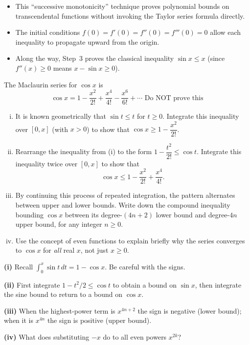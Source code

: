 \begin{takeaways}
\begin{itemize}[leftmargin=*]
  \item This ``successive monotonicity'' technique proves polynomial bounds on transcendental
        functions without invoking the Taylor series formula directly.
  \item The initial conditions $f(0)=f'(0)=f''(0)=f'''(0)=0$ allow each inequality to
        propagate upward from the origin.
  \item Along the way, Step~3 proves the classical inequality $\sin x \le x$ (since $f''(x)\ge0$
        means $x - \sin x \ge 0$).
\end{itemize}
\end{takeaways}

\begin{problem}
The Maclaurin series for $\cos x$ is
\[
\cos x = 1 - \frac{x^2}{2!} + \frac{x^4}{4!} - \frac{x^6}{6!} + \cdots \text{ Do NOT prove this}
\]

\begin{enumerate}[(i)]
  \item It is known geometrically that $\sin t \le t$ for $t \ge 0$.  Integrate this inequality
        over $[0, x]$ (with $x > 0$) to show that $\cos x \ge 1 - \dfrac{x^2}{2!}$.
  \item Rearrange the inequality from (i) to the form $1 - \dfrac{t^2}{2!} \le \cos t$.
        Integrate this inequality twice over $[0, x]$ to show that
        \[
        \cos x \le 1 - \frac{x^2}{2!} + \frac{x^4}{4!}.
        \]
  \item By continuing this process of repeated integration, the pattern alternates between upper
        and lower bounds.  Write down the compound inequality bounding $\cos x$ between its
        degree-$(4n+2)$ lower bound and degree-$4n$ upper bound, for any integer $n \ge 0$.
  \item Use the concept of even functions to explain briefly why the series converges to
        $\cos x$ for \emph{all} real $x$, not just $x \ge 0$.
\end{enumerate}
\end{problem}

\begin{hintbox}
\textbf{(i)} Recall $\int_0^x \sin t\,dt = 1 - \cos x$.  Be careful with the signs.

\textbf{(ii)} First integrate $1 - t^2/2 \le \cos t$ to obtain a bound on $\sin x$, then
integrate the sine bound to return to a bound on $\cos x$.

\textbf{(iii)} When the highest-power term is $x^{4n+2}$ the sign is negative (lower bound);
when it is $x^{4n}$ the sign is positive (upper bound).

\textbf{(iv)} What does substituting $-x$ do to all even powers $x^{2k}$?
\end{hintbox}


